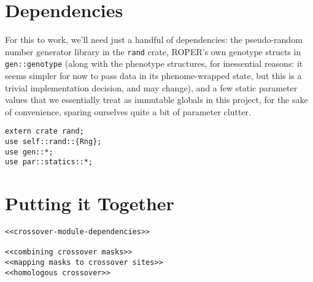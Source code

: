 \documentclass[11pt]{article}
\begin{document}
\section{Dependencies}
\label{sec:org584126e}

For this to work, we'll need just a handful of dependencies: the pseudo-random
number generator library in the \texttt{rand} crate, ROPER's own genotype structs in
\texttt{gen::genotype} (along with the phenotype structures, for inessential reasons:
it seems simpler for now to pass data in its phenome-wrapped state, but this is
a trivial implementation decision, and may change), and a few static parameter
values that we essentially treat as immutable globals in this project, for
the sake of convenience, sparing ourselves quite a bit of parameter clutter.

\lstset{language=rust,label=org9d71ad8,caption= ,captionpos=b,numbers=none}
\begin{lstlisting}
extern crate rand;
use self::rand::{Rng};
use gen::*;
use par::statics::*;
\end{lstlisting}


\section{Putting it Together}
\label{sec:org4bf025c}
\lstset{language=rust,label=orgc3876cf,caption= ,captionpos=b,numbers=none}
\begin{lstlisting}
<<crossover-module-dependencies>>

<<combining crossover masks>>
<<mapping masks to crossover sites>>
<<homologous crossover>>
\end{lstlisting}
\end{document}
